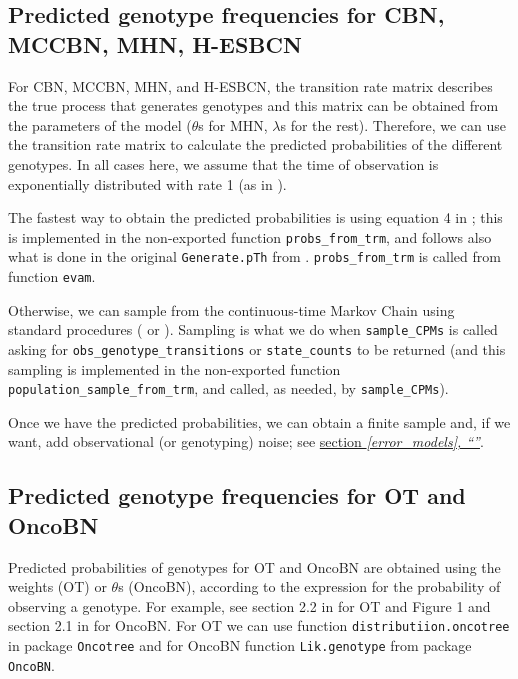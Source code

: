 \documentclass[a4paper,11pt]{article}
\newcommand*{\qrefS}[1]{\hyperref[{#1}]{section \textit{\ref*{#1},
      ``\nameref*{#1}''}}}
\begin{document}
\subsection{Predicted genotype frequencies for CBN, MCCBN, MHN, H-ESBCN}
\label{predicted-cbn-et-al}

For CBN, MCCBN, MHN, and H-ESBCN, the transition rate matrix describes the true process that generates genotypes and this matrix can be obtained from the parameters of the model ($\theta$s for MHN, $\lambda$s for the rest). Therefore, we can use the transition rate matrix to calculate the predicted probabilities of the different genotypes. In all cases here, we assume that the time of observation is exponentially distributed with rate 1 (as in \citealp{gerstung2009quantifying, schill2020modelling}).


The fastest way to obtain the predicted probabilities is using equation 4 in 
\cite{schill2020modelling}; this is implemented in the non-exported function \texttt{probs\_from\_trm}, and follows also what is done in the original \texttt{Generate.pTh} from \cite{schill2020modelling}. \texttt{probs\_from\_trm} is called from function \texttt{evam}.


Otherwise, we can sample from the continuous-time Markov Chain using standard procedures (\citealp[e.g., ch.~5 in][]{wilkinson2019stochastic} or \citealp[][Algorithm 1]{gotovos2021}). Sampling is what we do when \texttt{sample\_CPMs} is called asking for \texttt{obs\_genotype\_transitions} or \texttt{state\_counts} to be returned (and this sampling is implemented in the non-exported function \texttt{population\_sample\_from\_trm}, and called, as needed, by \texttt{sample\_CPMs}).


Once we have the predicted probabilities, we can obtain a finite sample and, if we want, add observational (or genotyping) noise; see \qrefS{error_models}.


\subsection{Predicted genotype frequencies for OT and OncoBN}
\label{predicted-ot-oncobn}
Predicted probabilities of genotypes for OT and OncoBN are obtained using the weights (OT) or $\theta$s (OncoBN), according to the expression for the probability of observing a genotype. For example, see section 2.2 in \cite{Szabo2008} for OT and Figure 1 and section 2.1 in \cite{nicol2021oncogenetic} for OncoBN. For OT we can use function \texttt{distributiion.oncotree} in package \texttt{Oncotree} and for OncoBN function \texttt{Lik.genotype} from package \texttt{OncoBN}.
\end{document}
